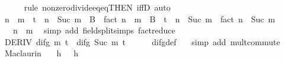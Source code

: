 \begin{isabellebody}
\ \ \ \ \isamarkupfalse%
\ {\isacharparenleft}{\kern0pt}rule\ nonzero{\isacharunderscore}{\kern0pt}divide{\isacharunderscore}{\kern0pt}eq{\isacharunderscore}{\kern0pt}eq{\isacharbrackleft}{\kern0pt}THEN\ iffD{}{\isacharbrackright}{\kern0pt}{\isacharparenright}{\kern0pt}\ auto\isanewline
\ \ \isamarkupfalse%
\isanewline
\ \ \isamarkupfalse%
\ {\isachardoublequoteopen}{\isacharparenleft}{\kern0pt}n\ {\isacharminus}{\kern0pt}\ m{\isacharparenright}{\kern0pt}\ {\isacharasterisk}{\kern0pt}\ t\ {\isacharcircum}{\kern0pt}\ {\isacharparenleft}{\kern0pt}n\ {\isacharminus}{\kern0pt}\ Suc\ m{\isacharparenright}{\kern0pt}\ {\isacharasterisk}{\kern0pt}\ B\ {\isacharslash}{\kern0pt}\ fact\ {\isacharparenleft}{\kern0pt}n\ {\isacharminus}{\kern0pt}\ m{\isacharparenright}{\kern0pt}\ {\isacharequal}{\kern0pt}\ B\ {\isacharasterisk}{\kern0pt}\ {\isacharparenleft}{\kern0pt}t\ {\isacharcircum}{\kern0pt}\ {\isacharparenleft}{\kern0pt}n\ {\isacharminus}{\kern0pt}\ Suc\ m{\isacharparenright}{\kern0pt}\ {\isacharslash}{\kern0pt}\ fact\ {\isacharparenleft}{\kern0pt}n\ {\isacharminus}{\kern0pt}\ Suc\ m{\isacharparenright}{\kern0pt}{\isacharparenright}{\kern0pt}{\isachardoublequoteclose}\isanewline
\ \ \ \ \isamarkupfalse%
\ {\isacartoucheopen}{}\ {\isacharless}{\kern0pt}\ n\ {\isacharminus}{\kern0pt}\ m{\isacartoucheclose}\ \isamarkupfalse%
\ {\isacharparenleft}{\kern0pt}simp\ add{\isacharcolon}{\kern0pt}\ field{\isacharunderscore}{\kern0pt}split{\isacharunderscore}{\kern0pt}simps\ fact{\isacharunderscore}{\kern0pt}reduce{\isacharparenright}{\kern0pt}\isanewline
\ \ \isamarkupfalse%
\ \isamarkupfalse%
\ {\isachardoublequoteopen}DERIV\ {\isacharparenleft}{\kern0pt}difg\ m{\isacharparenright}{\kern0pt}\ t\ {\isacharcolon}{\kern0pt}{\isachargreater}{\kern0pt}\ difg\ {\isacharparenleft}{\kern0pt}Suc\ m{\isacharparenright}{\kern0pt}\ t{\isachardoublequoteclose}\isanewline
\ \ \ \ \isamarkupfalse%
\ difg{\isacharunderscore}{\kern0pt}def\ \ \isamarkupfalse%
\ {\isacharparenleft}{\kern0pt}simp\ add{\isacharcolon}{\kern0pt}\ mult{\isachardot}{\kern0pt}commute{\isacharparenright}{\kern0pt}\isanewline
{}\isamarkupfalse%
%
\endisatagproof
{\isafoldproof}%
%
\isadelimproof
\isanewline
%
\endisadelimproof
\isanewline
{}\isamarkupfalse%
\ Maclaurin{\isacharcolon}{\kern0pt}\isanewline
\ \ \ h{\isacharcolon}{\kern0pt}\ {\isachardoublequoteopen}{}\ {\isacharless}{\kern0pt}\ h{\isachardoublequoteclose}\isanewline

\end{isabellebody}

